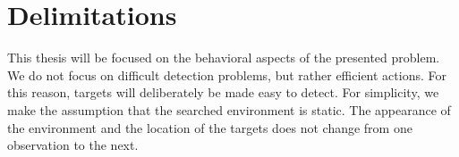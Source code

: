 \section{Delimitations}
\label{sec:delimitations}


This thesis will be focused on the behavioral aspects of the presented problem.
We do not focus on difficult detection problems, but rather efficient actions.
For this reason, targets will deliberately be made easy to detect.
For simplicity, we make the assumption that the searched environment is static.
The appearance of the environment and the location of the targets does not change from one observation to the next.
